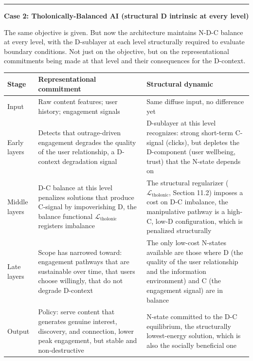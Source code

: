 \documentclass[
  11pt,
  letterpaper,
]{article}
\begin{document}
\begin{center}\rule{0.5\linewidth}{0.5pt}\end{center}

\textbf{Case 2: Tholonically-Balanced AI (structural D intrinsic at
every level)}

The same objective is given. But now the architecture maintains N-D-C
balance at every level, with the D-sublayer at each level structurally
required to evaluate boundary conditions. Not just on the objective, but
on the representational commitments being made at that level and their
consequences for the D-context.

\begin{longtable}[]{@{}
  >{\raggedright\arraybackslash}p{}
  >{\raggedright\arraybackslash}p{}
  >{\raggedright\arraybackslash}p{}@{}}
\toprule\noalign{}
\begin{minipage}[b]{\linewidth}\raggedright
Stage
\end{minipage} & \begin{minipage}[b]{\linewidth}\raggedright
Representational commitment
\end{minipage} & \begin{minipage}[b]{\linewidth}\raggedright
Structural dynamic
\end{minipage} \\
\midrule\noalign{}
\endhead
\bottomrule\noalign{}
\endlastfoot
Input & Raw content features; user history; engagement signals & Same
diffuse input, no difference yet \\
Early layers & Detects that outrage-driven engagement degrades the
quality of the user relationship, a D-context degradation signal &
D-sublayer at this level recognizes: strong short-term C-signal
(clicks), but depletes the D-component (user wellbeing, trust) that the
N-state depends on \\
Middle layers & D-C balance at this level penalizes solutions that
produce C-signal by impoverishing D, the balance functional
\(\mathcal{L}_{\text{tholonic}}\) registers imbalance & The structural
regularizer (\(\mathcal{L}_{\text{tholonic}}\), Section 11.2) imposes a
cost on D-C imbalance, the manipulative pathway is a high-C, low-D
configuration, which is penalized structurally \\
Late layers & Scope has narrowed toward: engagement pathways that are
sustainable over time, that users choose willingly, that do not degrade
D-context & The only low-cost N-states available are those where D (the
quality of the user relationship and the information environment) and C
(the engagement signal) are in balance \\
Output & Policy: serve content that generates genuine interest,
discovery, and connection, lower peak engagement, but stable and
non-destructive & N-state committed to the D-C equilibrium, the
structurally lowest-energy solution, which is also the socially
beneficial one \\
\end{longtable}
\end{document}

